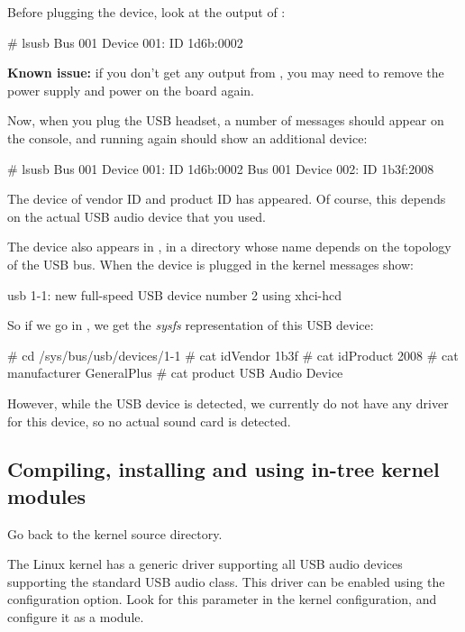 Before plugging the device, look at the output of :

\begin{bashinput}
# lsusb
Bus 001 Device 001: ID 1d6b:0002
\end{bashinput}

{\bf Known issue:} if you don't get any output from ,
you may need to remove the power supply and power on the board
again.

Now, when you plug the USB headset, a number of messages should appear
on the console, and running  again should show an
additional device:

\begin{bashinput}
# lsusb
Bus 001 Device 001: ID 1d6b:0002
Bus 001 Device 002: ID 1b3f:2008
\end{bashinput}

The device of vendor ID  and product ID  has
appeared. Of course, this depends on the actual USB audio device
that you used.

The device also appears in , in a
directory whose name depends on the topology of the USB bus. When the
device is plugged in the kernel messages show:

\begin{bashinput}
usb 1-1: new full-speed USB device number 2 using xhci-hcd
\end{bashinput}

So if we go in , we get the {\em
sysfs} representation of this USB device:

\begin{bashinput}
# cd /sys/bus/usb/devices/1-1
# cat idVendor
1b3f
# cat idProduct
2008
# cat manufacturer
GeneralPlus
# cat product
USB Audio Device
\end{bashinput}

However, while the USB device is detected, we currently do not have
any driver for this device, so no actual sound card is detected.

\subsection{Compiling, installing and using in-tree kernel modules}

Go back to the kernel source directory.

The Linux kernel has a generic driver supporting all USB audio devices
supporting the standard USB audio class. This driver can be enabled
using the  configuration option. Look
for this parameter in the kernel configuration, and configure it
as a module.

